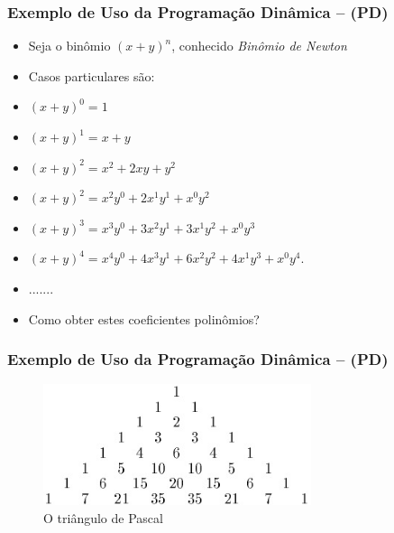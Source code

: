 \begin{frame}[fragile]

\frametitle{Exemplo de Uso da Programação Dinâmica -- (PD)}



\begin{itemize}
  \item Seja o binômio ${\left(x + y\right)}^n$, conhecido \textit{Binômio de Newton}

  \pause 
  \item Casos particulares são:
  \item  ${\left(x + y\right)}^0 = 1$
  \item  ${\left(x + y\right)}^1 = x + y$
  \item  ${\left(x + y\right)}^2 = x^2 + 2xy + y^2$
  
  \pause
  \item  ${\left(x + y\right)}^2 = x^2y^0 + 2x^1y^1 + x^0y^2$
  \item  ${\left(x + y\right)}^3 = x^3y^0 + 3x^2y^1 + 3x^1y^2 + x^0y^3$
  \item  ${\left(x + y\right)}^4 = x^4y^0 + 4x^3y^1 + 6x^2y^2 + 4x^1y^3 + x^0y^4.$
    \item  .......
    \pause
 \item Como obter estes coeficientes  polinômios?  

\end{itemize}

    
\end{frame}


\begin{frame}[fragile]

\frametitle{Exemplo de Uso da Programação Dinâmica -- (PD)}

\begin{figure}[!htb]
\centering
\includegraphics[width=0.70\textwidth, height=0.60\textheight]{figures/pascal_triangle_01.jpg}
\caption{O triângulo de Pascal}
\end{figure}
\end{frame}


